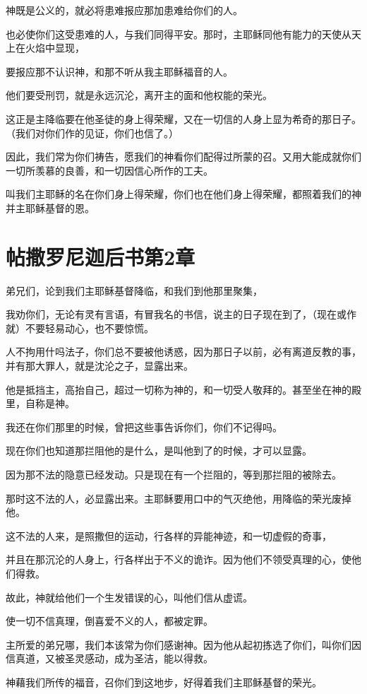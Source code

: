 \documentclass[12pt,oneside]{book}
\begin{document}
神既是公义的，就必将患难报应那加患难给你们的人。

也必使你们这受患难的人，与我们同得平安。那时，主耶稣同他有能力的天使从天上在火焰中显现，

要报应那不认识神，和那不听从我主耶稣福音的人。

他们要受刑罚，就是永远沉沦，离开主的面和他权能的荣光。

这正是主降临要在他圣徒的身上得荣耀，又在一切信的人身上显为希奇的那日子。（我们对你们作的见证，你们也信了。）

因此，我们常为你们祷告，愿我们的神看你们配得过所蒙的召。又用大能成就你们一切所羡慕的良善，和一切因信心所作的工夫。

叫我们主耶稣的名在你们身上得荣耀，你们也在他们身上得荣耀，都照着我们的神并主耶稣基督的恩。

\chapter{帖撒罗尼迦后书第2章}
弟兄们，论到我们主耶稣基督降临，和我们到他那里聚集，

我劝你们，无论有灵有言语，有冒我名的书信，说主的日子现在到了，（现在或作就）不要轻易动心，也不要惊慌。

人不拘用什吗法子，你们总不要被他诱惑，因为那日子以前，必有离道反教的事，并有那大罪人，就是沈沦之子，显露出来。

他是抵挡主，高抬自己，超过一切称为神的，和一切受人敬拜的。甚至坐在神的殿里，自称是神。

我还在你们那里的时候，曾把这些事告诉你们，你们不记得吗。

现在你们也知道那拦阻他的是什么，是叫他到了的时候，才可以显露。

因为那不法的隐意已经发动。只是现在有一个拦阻的，等到那拦阻的被除去。

那时这不法的人，必显露出来。主耶稣要用口中的气灭绝他，用降临的荣光废掉他。

这不法的人来，是照撒但的运动，行各样的异能神迹，和一切虚假的奇事，

并且在那沉沦的人身上，行各样出于不义的诡诈。因为他们不领受真理的心，使他们得救。

故此，神就给他们一个生发错误的心，叫他们信从虚谎。

使一切不信真理，倒喜爱不义的人，都被定罪。

主所爱的弟兄哪，我们本该常为你们感谢神。因为他从起初拣选了你们，叫你们因信真道，又被圣灵感动，成为圣洁，能以得救。

神藉我们所传的福音，召你们到这地步，好得着我们主耶稣基督的荣光。
\end{document}
